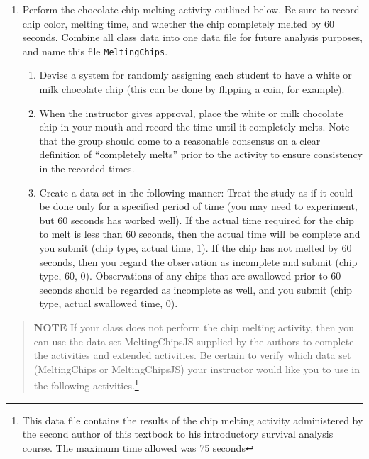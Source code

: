 \documentclass[
]{report}
\providecommand{\tightlist}{%
  \setlength{\itemsep}{0pt}\setlength{\parskip}{0pt}}
\begin{document}
\begin{enumerate}
\def\labelenumi{\arabic{enumi}.}
\tightlist
\item
  Perform the chocolate chip melting activity outlined below. Be sure to record chip color, melting time, and whether the chip completely melted by 60 seconds. Combine all class data into one data file for future analysis purposes, and name this file \texttt{MeltingChips}.

  \begin{enumerate}
  \def\labelenumii{(\alph{enumii})}
  \tightlist
  \item
    Devise a system for randomly assigning each student to have a white or milk chocolate chip (this can be done by flipping a coin, for example).\\
  \item
    When the instructor gives approval, place the white or milk chocolate chip in your mouth and record the time until it completely melts. Note that the group should come to a reasonable consensus on a clear definition of ``completely melts'' prior to the activity to ensure consistency in the recorded times.\\
  \item
    Create a data set in the following manner: Treat the study as if it could be done only for a specified period of time (you may need to experiment, but 60 seconds has worked well). If the actual time required for the chip to melt is less than 60 seconds, then the actual time will be complete and you submit (chip type, actual time, 1). If the chip has not melted by 60 seconds, then you regard the observation as incomplete and submit (chip type, 60, 0). Observations of any chips that are swallowed prior to 60 seconds should be regarded as incomplete as well, and you submit (chip type, actual swallowed time, 0).
  \end{enumerate}
\end{enumerate}

\begin{quote}
\textbf{NOTE} If your class does not perform the chip melting activity, then you can use the data set MeltingChipsJS supplied by the authors to complete the activities and extended activities. Be certain to verify which data set (MeltingChips or MeltingChipsJS) your instructor would like you to use in the following activities.\footnote{This data file contains the results of the chip melting activity administered by the second author of this textbook to his introductory survival analysis course. The maximum time allowed was 75 seconds}
\end{quote}
\end{document}
